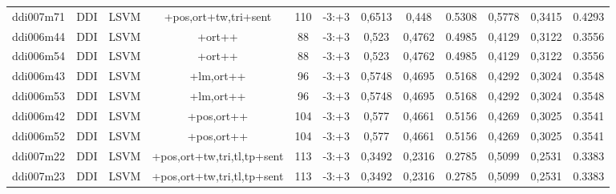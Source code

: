 \documentclass[a4paper]{article}
\begin{document}
\begin{landscape}
\begin{center}
\begin{tabular}{ |c|c|c|c|c|c|c|c|c|c|c|c|}
 	
 
 	
 		
 		\small{ ddi007m71 } & DDI & LSVM & +pos,ort+tw,tri+sent  &  110 &  -3:+3  &  0,6513 & 0,448 & 0.5308  &  0,5778 & 0,3415 & 0.4293 \\
 		

 	
 
 	
 		
 		\small{ ddi006m44 } & DDI & LSVM & +ort++  &  88 &  -3:+3  &  0,523 & 0,4762 & 0.4985  &  0,4129 & 0,3122 & 0.3556 \\
 		

 	
 
 	
 		
 		\small{ ddi006m54 } & DDI & LSVM & +ort++  &  88 &  -3:+3  &  0,523 & 0,4762 & 0.4985  &  0,4129 & 0,3122 & 0.3556 \\
 		

 	
 
 	
 		
 		\small{ ddi006m43 } & DDI & LSVM & +lm,ort++  &  96 &  -3:+3  &  0,5748 & 0,4695 & 0.5168  &  0,4292 & 0,3024 & 0.3548 \\
 		

 	
 
 	
 		
 		\small{ ddi006m53 } & DDI & LSVM & +lm,ort++  &  96 &  -3:+3  &  0,5748 & 0,4695 & 0.5168  &  0,4292 & 0,3024 & 0.3548 \\
 		

 	
 
 	
 		
 		\small{ ddi006m42 } & DDI & LSVM & +pos,ort++  &  104 &  -3:+3  &  0,577 & 0,4661 & 0.5156  &  0,4269 & 0,3025 & 0.3541 \\
 		

 	
 
 	
 		
 		\small{ ddi006m52 } & DDI & LSVM & +pos,ort++  &  104 &  -3:+3  &  0,577 & 0,4661 & 0.5156  &  0,4269 & 0,3025 & 0.3541 \\
 		

 	
 
 	
 		
 		\small{ ddi007m22 } & DDI & LSVM & +pos,ort+tw,tri,tl,tp+sent  &  113 &  -3:+3  &  0,3492 & 0,2316 & 0.2785  &  0,5099 & 0,2531 & 0.3383 \\
 		

 	
 
 	
 		
 		\small{ ddi007m23 } & DDI & LSVM & +pos,ort+tw,tri,tl,tp+sent  &  113 &  -3:+3  &  0,3492 & 0,2316 & 0.2785  &  0,5099 & 0,2531 & 0.3383 \\
 		


\end{tabular}
\end{center}
\end{landscape}
\end{document}
